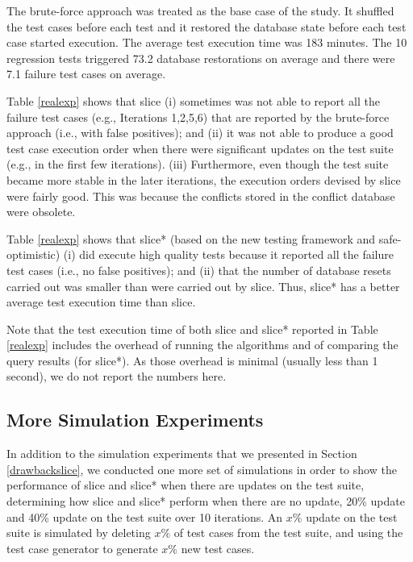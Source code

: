 \documentclass[authoryear,preprint,12pt]{elsarticle}
\begin{document}
The brute-force approach was treated as the base case of the study.
It shuffled the test cases before each test and 
it restored the database state before each test case started execution.
The average test execution time was 183 minutes.
The 10 regression tests triggered 73.2 database restorations on average and there were 7.1 failure test cases on average.

Table \ref{realexp} shows that {\sc slice} 
(i) sometimes was not able to report all the failure test cases (e.g., Iterations 1,2,5,6) that are reported by the brute-force approach (i.e., with false positives); and
(ii) it was not able to produce a good test case execution order when there were significant updates on the test suite (e.g., in the first few iterations).
(iii) Furthermore, even though the test suite became more stable in the later iterations,
the execution orders devised by {\sc slice}  
were fairly good.  This was because the conflicts stored in the conflict database were obsolete.

Table \ref{realexp} shows that {\sc slice*} (based on the new testing framework and {\sc safe-optimistic})
(i) did execute high quality tests because it reported all the failure test cases (i.e., no false positives); and
(ii) that the number of database resets carried out was smaller than were carried out by {\sc slice}.
Thus, {\sc slice*} has a better average test execution time than {\sc slice}.

Note that the test execution time of both {\sc slice} and {\sc slice*} reported in Table \ref{realexp} 
includes the overhead of running the algorithms and of comparing the query results (for {\sc slice*}).
As those overhead is minimal (usually less than 1 second), we do not report the numbers here.

   \subsection{More Simulation Experiments}
     \label{synthetic}
   In addition to the simulation experiments that we presented in Section \ref{drawbackslice}, 
   we conducted one more set of simulations in order to show the performance of {\sc slice} and {\sc slice*} 
   when there are updates on the test suite, determining how {\sc slice} and {\sc slice*} perform when there are no update, 20\% update and 40\% update on the test suite over 10 iterations.
   An $x\%$ update on the test suite is simulated by deleting $x\%$ of test cases from the test suite,
   and using the test case generator to generate $x\%$ new test cases.
   
\end{document}
